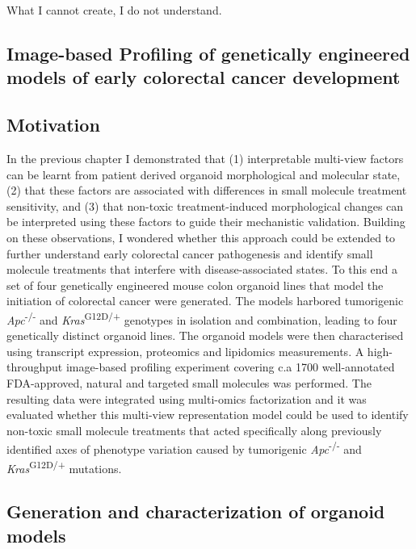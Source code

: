 \begin{savequote}[75mm]
What I cannot create, I do not understand.
\end{savequote}

\begin{flushleft}
\chapter{Image-based Profiling of genetically engineered models of early colorectal cancer development}

\section{Motivation}

In the previous chapter I demonstrated that (1) interpretable multi-view factors can be learnt from patient derived organoid morphological and molecular state, (2) that these factors are associated with differences in small molecule treatment sensitivity, and (3) that non-toxic treatment-induced morphological changes can be interpreted using these factors to guide their mechanistic validation. Building on these observations, I wondered whether this approach could be extended to further understand early colorectal cancer pathogenesis and identify small molecule treatments that interfere with disease-associated states.
\bigskip
To this end a set of four genetically engineered mouse colon organoid lines that model the initiation of colorectal cancer were generated. The models harbored tumorigenic \textit{Apc}\textsuperscript{-/-} and \textit{Kras}\textsuperscript{G12D/+} genotypes in isolation and combination, leading to four genetically distinct organoid lines. The organoid models were then characterised using transcript expression, proteomics and lipidomics measurements. A high-throughput image-based profiling experiment covering c.a 1700 well-annotated FDA-approved, natural and targeted small molecules was performed. The resulting data were integrated using multi-omics factorization and it was evaluated whether this multi-view representation model could be used to identify non-toxic small molecule treatments that acted specifically along previously identified axes of phenotype variation caused by tumorigenic \textit{Apc}\textsuperscript{-/-} and \textit{Kras}\textsuperscript{G12D/+} mutations. 

\section{Generation and characterization of organoid models}


\end{flushleft}
